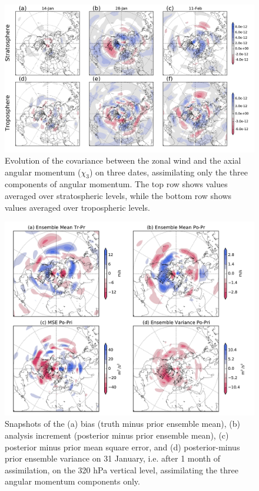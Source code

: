  \begin{figure}
	 \includegraphics[width=\textwidth]{Paper_figures/ERPDA_paper_U_to_LOD_covariances_.pdf}
	 \caption{Evolution of the covariance between the zonal wind and the axial angular momentum ($\chi_3$) on three dates, assimilating only the three components of angular momentum. The top row shows values averaged over stratospheric levels, while the bottom row shows values averaged over tropospheric levels.}
 \label{fig:covariances}
\end{figure}

 \begin{figure}
	 \includegraphics[width=\textwidth]{Paper_figures/ERPDA_paper_U_priorerror_vs_increment_vs_ER_31jan.pdf}
	 \caption{Snapshots of the (a) bias (truth minus prior ensemble mean), (b) analysis increment (posterior minus prior ensemble mean), (c) posterior minus prior mean square error, and (d) posterior-minus prior ensemble variance on 31 January, i.e. after 1 month of assimilation, on the 320 hPa vertical level, assimilating the three angular momentum components only. } 
 \label{fig:error_increments}
\end{figure}



